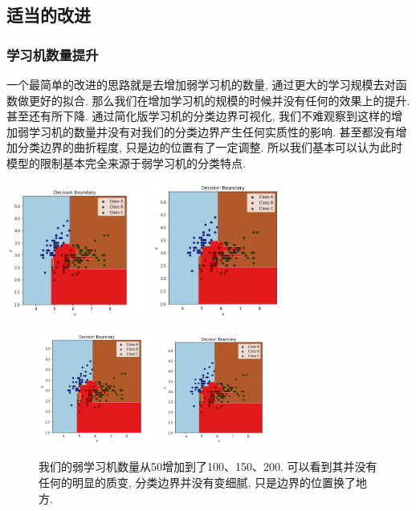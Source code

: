 \documentclass[lang=cn,11pt]{elegantpaper}
\begin{document}
\subsection{适当的改进}
\subsubsection{学习机数量提升}
一个最简单的改进的思路就是去增加弱学习机的数量, 通过更大的学习规模去对函数做更好的拟合. 那么我们在增加学习机的规模的时候并没有任何的效果上的提升. 甚至还有所下降. 通过简化版学习机的分类边界可视化, 我们不难观察到这样的增加弱学习机的数量并没有对我们的分类边界产生任何实质性的影响. 甚至都没有增加分类边界的曲折程度, 只是边的位置有了一定调整. 所以我们基本可以认为此时模型的限制基本完全来源于弱学习机的分类特点.
\begin{center}
  \includegraphics[width=0.35\textwidth]{adat50}
  \includegraphics[width=0.35\textwidth]{adat100}
\end{center}
\begin{figure}[h]
  \centering
    \includegraphics[width=0.35\textwidth]{adat150}
    \includegraphics[width=0.35\textwidth]{adat200}
    \caption{我们的弱学习机数量从50增加到了100、150、200. 可以看到其并没有任何的明显的质变, 分类边界并没有变细腻, 只是边界的位置换了地方.}
  \end{figure}
\end{document}
